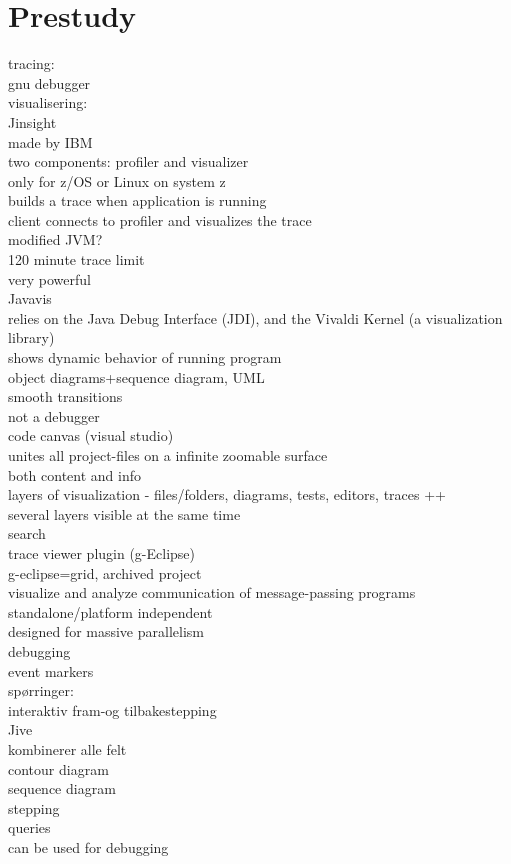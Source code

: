 \section{Prestudy}\label{Prestudy}

tracing:\\
gnu debugger\\

visualisering:\\


Jinsight\\
	made by IBM\\
	two components: profiler and visualizer\\
	only for z/OS or Linux on system z\\
	builds a trace when application is running\\
	client connects to profiler and visualizes the trace\\
	modified JVM?\\
	120 minute trace limit\\
	very powerful\\


Javavis\\
	relies on the Java Debug Interface (JDI), and the Vivaldi Kernel (a visualization library)\\
	shows dynamic behavior of running program\\
	object diagrams+sequence diagram, UML\\
	smooth transitions\\
	not a debugger\\
	
code canvas (visual studio)\\
	unites all project-files on a infinite zoomable surface\\
	both content and info\\
	layers of visualization - files/folders, diagrams, tests, editors, traces ++\\
	several layers visible at the same time\\
	search\\

trace viewer plugin (g-Eclipse)\\
	g-eclipse=grid, archived project\\
	visualize and analyze communication of message-passing programs\\
	standalone/platform independent\\
	designed for massive parallelism\\
	debugging\\
	event markers\\

spørringer:\\


interaktiv fram-og tilbakestepping\\


Jive\\
	kombinerer alle felt\\
	contour diagram\\
	sequence diagram\\
	stepping\\
	queries\\
	can be used for debugging\\




